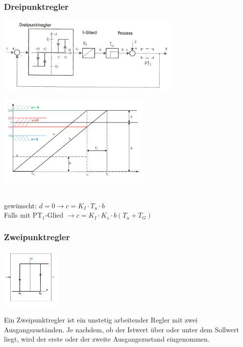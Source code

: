 	\subsubsection{Dreipunktregler}
		\begin{minipage}{9cm}
		\includegraphics[width=9cm]{./bilder/Dreipunktregler.jpg}
        \end{minipage}
		\begin{minipage}{7.5cm}
        \includegraphics[width=7.5cm]{./bilder/Dreipunktregler_dia.png}
        \end{minipage}\\
		gewünscht: $d = 0 \rightarrow c = K_I \cdot T_u \cdot b$\\
		Falls mit PT$_1$-Glied $\rightarrow c = K_I \cdot K_s \cdot b (T_u + T_G)$
		
		
	\subsubsection{Zweipunktregler}
		\begin{minipage}{3cm}
 		\includegraphics[height=3cm]{./bilder/Zweipunkteregler.png}
        \end{minipage}
		\begin{minipage}{15cm}
        Ein Zweipunktregler ist ein unstetig arbeitender Regler mit zwei
        Ausgangszuständen. Je nachdem, ob der Istwert über oder unter dem
        Sollwert liegt, wird der erste oder der zweite Ausgangszustand
        eingenommen. 
        \end{minipage}
        
